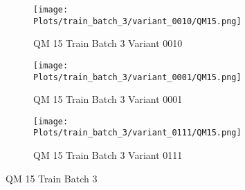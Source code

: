 \documentclass{DissertateFigs}
\begin{document}
\begin{figure}[t!]
\medskip

    \begin{subfigure}{0.32\textwidth}
    \texttt{[image: Plots/train\_batch\_3/variant\_0010/QM15.png]}
    \caption{QM 15 Train Batch 3 Variant 0010}
    \end{subfigure}
    \begin{subfigure}{0.32\textwidth}
    \texttt{[image: Plots/train\_batch\_3/variant\_0001/QM15.png]}
    \caption{QM 15 Train Batch 3 Variant 0001}
    \end{subfigure}

\medskip

    \begin{subfigure}{0.32\textwidth}
    \texttt{[image: Plots/train\_batch\_3/variant\_0111/QM15.png]}
    \caption{QM 15 Train Batch 3 Variant 0111}
    \end{subfigure}
\caption{QM 15 Train Batch 3}
    \end{figure}
\clearpage
\end{document}

